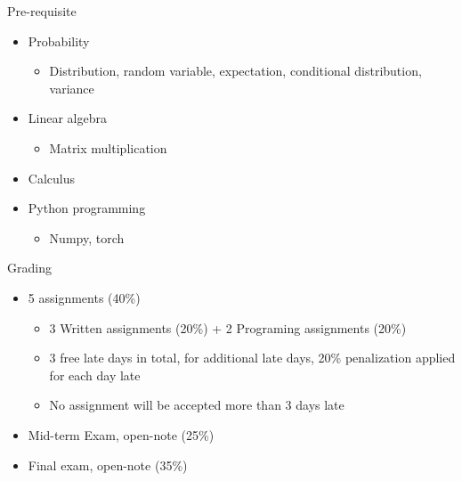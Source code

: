 \documentclass[aspectratio=169,12pt]{beamer}
\begin{document}
\begin{frame}[t]{Pre-requisite}
  \vspace{0.05cm}
  {\large
  \begin{itemize}
    \setlength{\itemsep}{0.60cm}
    \item Probability
      \begin{itemize}
        \item Distribution, random variable, expectation, conditional distribution,
              variance
      \end{itemize}
    \item Linear algebra
      \begin{itemize}
        \item Matrix multiplication
      \end{itemize}
     \item Calculus 
    \item Python programming
    \begin{itemize}
    	\item Numpy, torch
    \end{itemize}
  \end{itemize}
  }
\end{frame}

\begin{frame}[t]{Grading}
  \vspace{-0.05cm}
  {\large
  \begin{itemize}
    \setlength{\itemsep}{0.4cm}
    \item 5 assignments (40\%)
      \begin{itemize}
        \setlength{\itemsep}{0.2cm}
        \item 3 Written assignments (20\%) + 2 Programing assignments (20\%)
        \item \textcolor{warningred}{3 free late days in total, for additional late days,
              20\% penalization applied for each day late}
        \item No assignment will be accepted more than 3 days late
      \end{itemize}
    \item Mid-term Exam, open-note (25\%)
    \item Final exam, open-note (35\%)
  \end{itemize}
  }
\end{frame}
\end{document}
